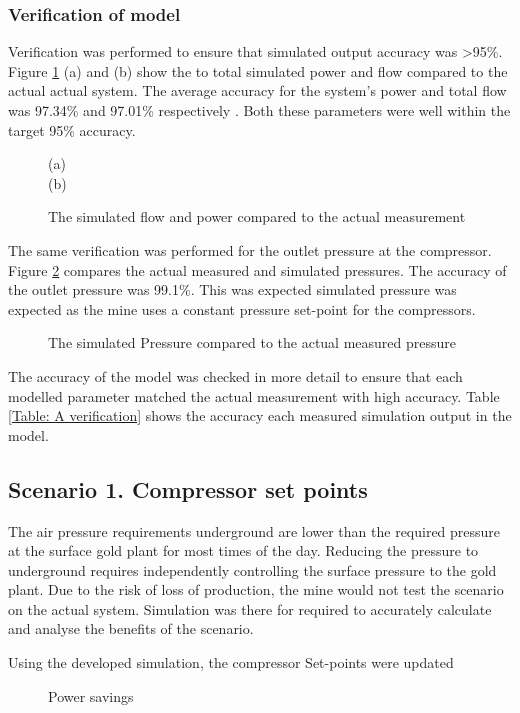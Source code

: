 \subsubsection{Verification of model}
Verification was performed to ensure that simulated output accuracy was >95\%. Figure \ref{fig: Verification Power+flow Beatrix} (a) and (b) show the to total simulated power and flow compared to the actual actual system. The average accuracy for the system's power and total flow was 97.34\%  and  97.01\% respectively . Both these parameters were well within the target 95\% accuracy.
\begin{figure}[h]
	\centering
	
	(a)\\
	
	(b)\\
	\caption{The simulated flow and power compared to the actual measurement}
	\label{fig: Verification Power+flow Beatrix}
\end{figure}
The same verification was performed for the outlet pressure at the compressor. Figure \ref{fig: Verification Pressure Beatrix} compares the actual measured and simulated pressures. The accuracy of the outlet pressure was 99.1\%. This was expected simulated pressure was expected as the mine uses a constant pressure set-point for the compressors.
\begin{figure}[h]
	\centering
	
	\caption{The simulated Pressure compared to the actual measured pressure}
	\label{fig: Verification Pressure Beatrix}
\end{figure}
\par
The accuracy of the model was checked in more detail to ensure that each modelled parameter matched the actual measurement with high accuracy. Table \ref{Table: A verification} shows the accuracy each measured simulation output in the model. 
\subsection{Scenario 1. Compressor set points}
The air pressure requirements underground are lower than the required pressure at the surface gold plant for most times of the day. Reducing the pressure to underground requires independently controlling the surface pressure to the gold plant. Due to the risk of loss of production, the mine would not test the scenario on the actual system. Simulation was there for required to accurately calculate and analyse the benefits of the scenario.
\par 
Using the developed simulation, the compressor Set-points were updated
\begin{figure}[h!]
	\centering
	
	\caption{Power savings}
	\label{fig: CompSetpoints Results Beatrix}
\end{figure}
